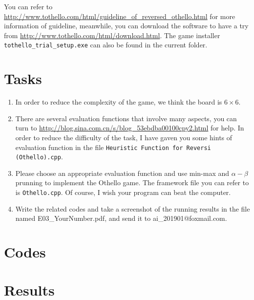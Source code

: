 ﻿\documentclass[a4paper, 11pt]{article}
\begin{document}
You can refer to \url{http://www.tothello.com/html/guideline_of_reversed_othello.html} for more information of guideline, meanwhile, you can download the software to have a try from \url{http://www.tothello.com/html/download.html}. The game installer \texttt{tothello\_trial\_setup.exe} can also be found in the current folder.



\section{Tasks}
\begin{enumerate}

\item In order to reduce the complexity of the game, we think the board is $6\times 6$.

\item There are several evaluation functions that involve many aspects, you can turn to \url{http://blog.sina.com.cn/s/blog_53ebdba00100cpy2.html} for help. In order to reduce the difficulty of the task, I have gaven you some hints of evaluation function in the file \texttt{Heuristic Function for Reversi (Othello).cpp}.

\item Please choose an appropriate evaluation function and use min-max and $\alpha-\beta$ prunning to implement the Othello game. The framework file you can refer to is \texttt{Othello.cpp}. Of course, I wish your program can beat the computer.

\item Write the related codes and take a screenshot of the running results in the file named \textsf{E03\_YourNumber.pdf}, and send it to \textsf{ai\_201901@foxmail.com}.
\end{enumerate}

\section{Codes}

\section{Results}


%
%
\end{document}
